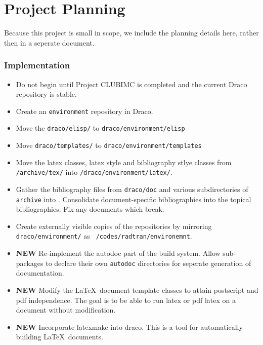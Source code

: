 \documentclass[11pt]{ResearchNote}
\begin{document}
\section*{Project Planning}

Because this project is small in scope, we include the planning
details here, rather then in a seperate document.

\subsubsection*{Implementation}

\begin{itemize}
\item Do not begin until Project CLUBIMC is completed and the current
  Draco repository is stable.

\item Create an {\tt environment} repository in Draco.

\item Move the {\tt draco/elisp/} to {\tt draco/environment/elisp}

\item Move {\tt draco/templates/} to {\tt draco/environment/templates}
  
\item Move the latex classes, latex style and bibliography stlye
  classes from {\tt/archive/tex/} into {\tt/draco/environment/latex/}.
  
\item Gather the bibliography files from {\tt draco/doc} and various
  subdirectories of {\tt archive} into . Consolidate document-specific
  bibliographies into the topical bibliographies. Fix any documents
  which break.
  
\item Create externally visible copies of the repositories by
  mirroring {\tt draco/environment/} as {\tt
    /codes/radtran/environemnt}.
  
\item {\bf NEW} Re-implement the autodoc part of the build system.
  Allow sub-packages to declare their own {\tt autodoc} directories
  for seperate generation of documentation.

\item {\bf NEW} Modify the \LaTeX\ document template classes to attain
  postscript and pdf independence. The goal is to be able to run latex
  or pdf latex on a document without modification.

\item {\bf NEW} Incorporate {\sf latexmake} into draco. This is a tool
  for automatically building \LaTeX\ documents. 
  
\end{itemize}
\end{document}
